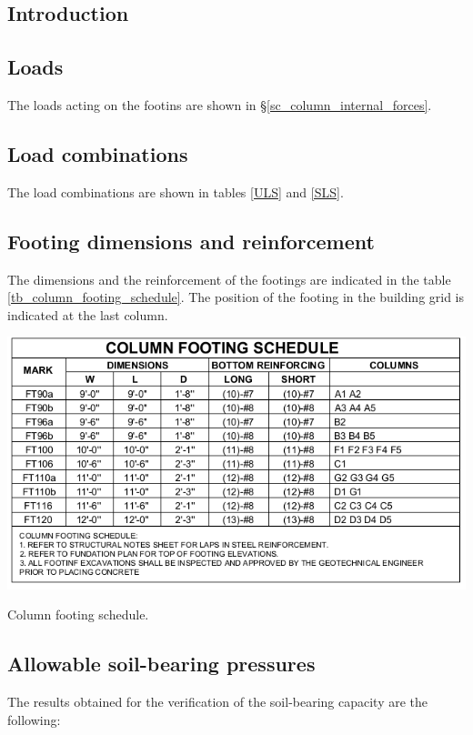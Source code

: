 \subsection{Introduction}


\subsection{Loads}
The loads acting on the footins are shown in \S \ref{sc_column_internal_forces}.

\subsection{Load combinations}
The load combinations are shown in tables \ref{ULS} and \ref{SLS}.

\subsection{Footing dimensions and reinforcement}
The dimensions and the reinforcement of the footings are indicated in the table \ref{tb_column_footing_schedule}. The position of the footing in the building grid is indicated at the last column.

\begin{table}
    \includegraphics[width=\linewidth]{figures/column_footing_schedule.png}
    \caption{Column footing schedule.}\label{tb_column_footing_schedule}
\end{table}

\subsection{Allowable soil-bearing pressures}
The results obtained for the verification of the soil-bearing capacity are the following:

